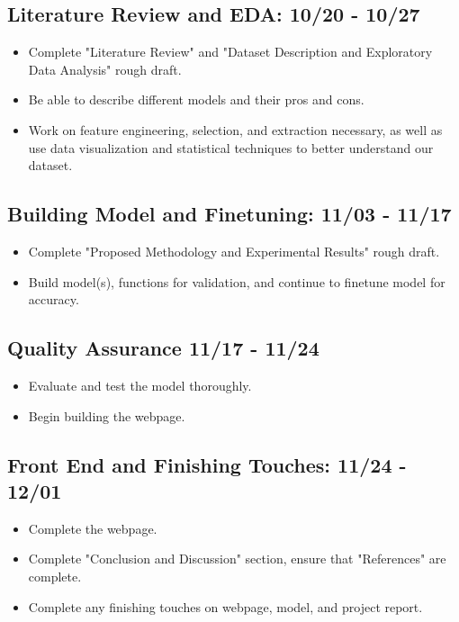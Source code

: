 \documentclass[conference]{IEEEtran}
\begin{document}
\subsection{\textbf{Literature Review and EDA: 10/20 - 10/27}}
\begin{itemize}
    \item Complete "Literature Review" and "Dataset Description and Exploratory Data Analysis" rough draft.
    \item Be able to describe different models and their pros and cons.
    \item Work on feature engineering, selection, and extraction necessary, as well as use data visualization and statistical techniques to better understand our dataset. 
\end{itemize}
\subsection{\textbf{Building Model and Finetuning: 11/03 - 11/17}}
\begin{itemize}
    \item Complete "Proposed Methodology and Experimental Results" rough draft.
    \item Build model(s), functions for validation, and continue to finetune model for accuracy.
\end{itemize}
\subsection{\textbf{Quality Assurance 11/17 - 11/24}}
\begin{itemize}
    \item Evaluate and test the model thoroughly. 
    \item Begin building the webpage.
\end{itemize}
\subsection{\textbf{Front End and Finishing Touches: 11/24 - 12/01}}
\begin{itemize}
    \item Complete the webpage.
    \item Complete "Conclusion and Discussion" section, ensure that "References" are complete.
    \item Complete any finishing touches on webpage, model, and project report.
\end{itemize}
\end{document}
